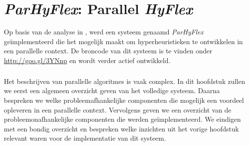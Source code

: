 \chapter{\emph{ParHyFlex}: Parallel \emph{HyFlex}}


Op basis van de analyse in , werd een systeem genaamd \emph{ParHyFlex} ge\"implementeerd die het mogelijk maakt om hyperheuristieken te ontwikkelen in een parallelle context. De broncode van dit systeem is te vinden onder \mbox{\url{http://goo.gl/3YNnp}} en wordt verder actief ontwikkeld.

\paragraph{}
Het beschrijven van parallelle algoritmes is vaak complex. In dit hoofdstuk zullen we eerst een algemeen overzicht geven van het volledige systeem. Daarna bespreken we welke probleemafhankelijke componenten die mogelijk een voordeel opleveren in een parallelle context. Vervolgens geven we een overzicht van de probleemonafhankelijke componenten die werden ge\"implementeerd. We eindigen met een bondig overzicht en bespreken welke inzichten uit het vorige hoofdstuk relevant waren voor de implementatie van dit systeem.









